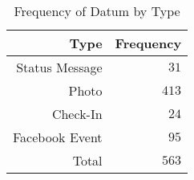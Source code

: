 \begin{table}[htp]
	\begin{center}
	\caption{Frequency of Datum by Type}
	\label{tab:ch4_table_datums_by_type}
		\begin{tabular}{r r}
		\toprule
			{Type} & {Frequency}\\
			\midrule
			Status Message & $31$\\
			Photo & $413$\\
			Check-In & $24$\\
			Facebook Event & $95$\\
			\midrule Total & $563$\\
		\bottomrule
		\end{tabular}
	\end{center}
\end{table}